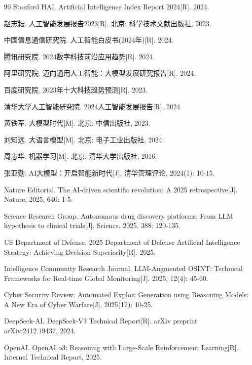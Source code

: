 \begin{thebibliography}{99}
 Stanford HAI. Artificial Intelligence Index Report 2024[R]. 2024.

 赵志耘. 人工智能发展报告2023[R]. 北京: 科学技术文献出版社, 2023.

 中国信息通信研究院. 人工智能白皮书(2024年)[R]. 2024.

 腾讯研究院. 2024数字科技前沿应用趋势[R]. 2024.

 阿里研究院. 迈向通用人工智能：大模型发展研究报告[R]. 2024.

 百度研究院. 2023年十大科技趋势预测[R]. 2023.

 清华大学人工智能研究院. 2024人工智能发展报告[R]. 2024.

 黄铁军. 大模型时代[M]. 北京: 中信出版社, 2023.

 刘知远. 大语言模型[M]. 北京: 电子工业出版社, 2024.

 周志华. 机器学习[M]. 北京: 清华大学出版社, 2016.

 张亚勤. AI大模型：开启智能新时代[J]. 清华管理评论, 2024(1): 10-15.

 Nature Editorial. The AI-driven scientific revolution: A 2025 retrospective[J]. Nature, 2025, 640: 1-5.

 Science Research Group. Autonomous drug discovery platforms: From LLM hypothesis to clinical trials[J]. Science, 2025, 388: 120-135.

 US Department of Defense. 2025 Department of Defense Artificial Intelligence Strategy: Achieving Decision Superiority[R]. 2025.

 Intelligence Community Research Journal. LLM-Augmented OSINT: Technical Frameworks for Real-time Global Monitoring[J]. 2025, 12(4): 45-60.

 Cyber Security Review. Automated Exploit Generation using Reasoning Models: A New Era of Cyber Warfare[J]. 2025(12): 10-25.

 DeepSeek-AI. DeepSeek-V3 Technical Report[R]. arXiv preprint arXiv:2412.19437, 2024.

 OpenAI. OpenAI o3: Reasoning with Large-Scale Reinforcement Learning[R]. Internal Technical Report, 2025.


\end{thebibliography}
